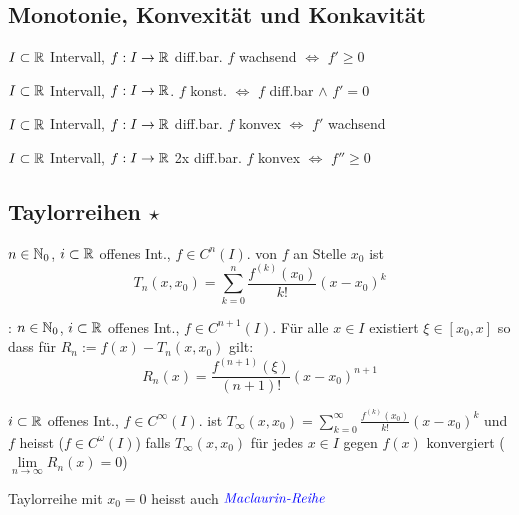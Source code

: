 \subsection{Monotonie, Konvexität und Konkavität}

\Satz $I \subset \mathbb{R}$ Intervall, $f: I \to \mathbb{R}$ diff.bar.
$f$ wachsend $\iff$ $f' \ge 0$

\Kor $I \subset \mathbb{R}$ Intervall, $f: I \to \mathbb{R}$.
$f$ konst. $\iff$ $f$ diff.bar $\land$ $f' = 0$

\Satz $I \subset \mathbb{R}$ Intervall, $f: I \to \mathbb{R}$ diff.bar.
$f$ konvex $\iff$ $f'$ wachsend

\Kor $I \subset \mathbb{R}$ Intervall, $f: I \to \mathbb{R}$ 2x diff.bar.
$f$ konvex $\iff$ $f'' \ge 0$

\subsection{Taylorreihen \texorpdfstring{$\star$}{*}}

\Def $n \in \mathbb{N}_0$, $i \subset \mathbb{R}$ offenes Int., $f \in C^n(I)$.  von $f$
an Stelle $x_0$ ist
$$T_n(x, x_0) = \sum_{k=0}^{n}\frac{f^{(k)}(x_0)}{k!}(x-x_0)^k$$ 

\Satz {}: $n \in \mathbb{N}_0$, $i \subset \mathbb{R}$ offenes Int., $f \in C^{n+1}(I)$. Für alle $x \in I$
existiert  $\xi \in [x_0, x]$ so dass für $R_n := f(x) - T_n(x, x_0)$ gilt:
$$R_n(x) = \frac{f^{(n+1)}(\xi)}{(n+1)!}(x-x_0)^{n+1}$$

\Def $i \subset \mathbb{R}$ offenes Int., $f \in C^\infty(I)$.  ist 
$T_\infty(x, x_0) = \sum_{k=0}^{\infty}\frac{f^{(k)}(x_0)}{k!}(x-x_0)^k$
und $f$ heisst  ($f \in C^\omega(I)$) falls $T_\infty(x, x_0)$ für jedes
$x \in I$ gegen $f(x)$ konvergiert ($\lim\limits_{n\to\infty} R_n(x) = 0$)

\Def Taylorreihe mit $x_0 = 0$ heisst auch $\textit{\color{blue}{Maclaurin-Reihe}}$

